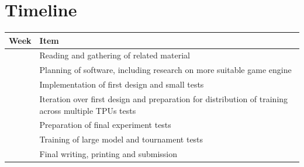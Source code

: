 \documentclass{../lib/llncs}
\begin{document}
\section{Timeline}
\begin{table}
  \begin{center}
    \begin{tabularx}{\textwidth}{ | X | X | }
      \hline
      Week    & Item                                                                                                 \\
      \hline
      [-2, 1) & Foundational courses on usage of tensorflow and notation in RL                                       \\
      \hline
      [1, 2]  & Reading and gathering of related material                                                            \\
      \hline
      [3 - 4] & Planning of software, including research on more suitable game engine                                \\
      \hline
      [5]     & Implementation of first design and small tests                                                       \\
      \hline
      [6]     & Iteration over first design and preparation for distribution of training across multiple TPUs  tests \\
      \hline
      [7]     & Preparation of final experiment   tests                                                              \\
      \hline
      [8 - 9] & Training of large model and tournament   tests                                                       \\
      \hline
      [10-12] & Final writing, printing and submission                                                               \\
      \hline
    \end{tabularx}
  \end{center}
  \label{timetable}
\end{table}

\newpage
\end{document}
